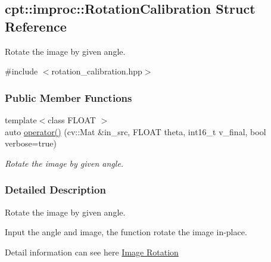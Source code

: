 \hypertarget{structcpt_1_1improc_1_1_rotation_calibration}{\subsection{cpt\-:\-:improc\-:\-:Rotation\-Calibration Struct Reference}
\label{structcpt_1_1improc_1_1_rotation_calibration}
}


Rotate the image by given angle.  




{\ttfamily \#include $<$rotation\-\_\-calibration.\-hpp$>$}

\subsubsection*{Public Member Functions}
\begin{DoxyCompactItemize}
\item 
{\footnotesize template$<$class F\-L\-O\-A\-T $>$ }\\auto \hyperlink{structcpt_1_1improc_1_1_rotation_calibration_a77fde92277e17b18ab6f809d7b0e558c}{operator()} (cv\-::\-Mat \&in\-\_\-src, F\-L\-O\-A\-T theta, int16\-\_\-t v\-\_\-final, bool verbose=true)
\begin{DoxyCompactList}\small\item\em Rotate the image by given angle. \end{DoxyCompactList}\end{DoxyCompactItemize}


\subsubsection{Detailed Description}
Rotate the image by given angle. 

Input the angle and image, the function rotate the image in-\/place.

Detail information can see here \hyperlink{improc_image_rotation}{Image Rotation} 

